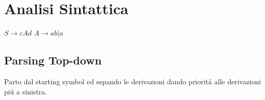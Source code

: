 \chapter{Analisi Sintattica}
$S \rightarrow cAd$
$A \rightarrow ab | a$

\section{Parsing Top-down}
Parto dal starting symbol ed espando le derivazioni dando priorit\'a alle derivazioni pi\'u a sinistra.
